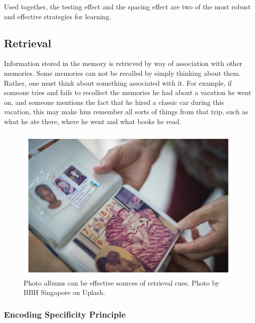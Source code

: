 \documentclass[
]{krantz}
\begin{document}
Used together, the testing effect and the spacing effect are two of the most robust and effective strategies for learning.

\hypertarget{retrieval}{%
\subsection*{Retrieval}\label{retrieval}}


Information stored in the memory is retrieved by way of association with other memories. Some memories can not be recalled by simply thinking about them. Rather, one must think about something associated with it. For example, if someone tries and fails to recollect the memories he had about a vacation he went on, and someone mentions the fact that he hired a classic car during this vacation, this may make him remember all sorts of things from that trip, such as what he ate there, where he went and what books he read.

\begin{figure}

{\centering \includegraphics[width=0.6\linewidth]{images/ch5/fig5} 

}

\caption{Photo albums can be effective sources of retrieval cues. Photo by BBH Singapore on Uplash.}\label{fig:albumbs}
\end{figure}

\hypertarget{encoding-specificity-principle}{%
\subsubsection*{Encoding Specificity Principle}\label{encoding-specificity-principle}}
\end{document}
